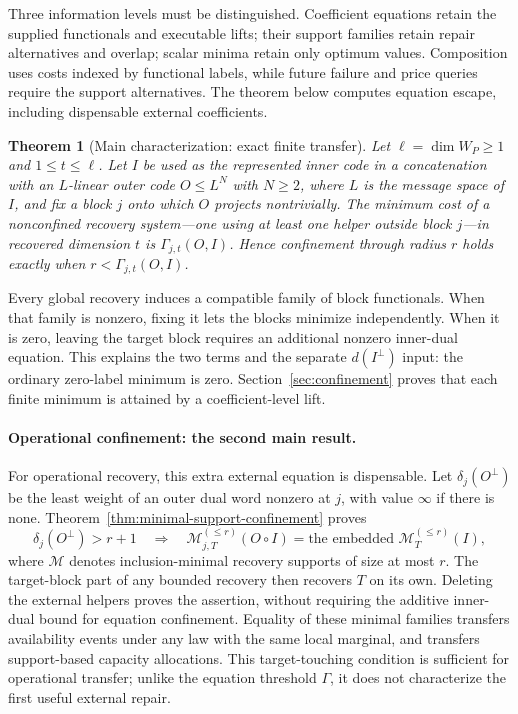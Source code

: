 \documentclass[11pt]{article}
\newtheorem{theorem}{Theorem}[section]
\theoremstyle{definition}
\begin{document}
Three information levels must be distinguished.  Coefficient equations
retain the supplied functionals and executable lifts; their support families
retain repair alternatives and overlap; scalar minima retain only optimum
values.  Composition uses costs indexed by functional labels, while future
failure and price queries require the support alternatives.  The theorem
below computes equation escape, including dispensable external coefficients.

\begin{theorem}[Main characterization: exact finite transfer]
\label{thm:main}
%
%
Let $\ell=\dim W_P\geq1$ and $1\leq t\leq\ell$.  Let $I$ be used as the
represented inner code in a concatenation with an
$L$-linear outer code $O\leq L^N$ with $N\geq2$, where $L$ is the message space of $I$,
and fix a block $j$ onto which $O$ projects nontrivially.  The minimum cost of a
nonconfined recovery system---one using at least one helper outside block
$j$---in recovered dimension $t$ is
$\Gamma_{j,t}(O,I)$.  Hence confinement through radius $r$ holds exactly when
$r<\Gamma_{j,t}(O,I)$.
\end{theorem}

Every global recovery induces a compatible family of block functionals.
When that family is nonzero, fixing it lets the blocks minimize independently.
When it is zero, leaving the target block requires an additional nonzero
inner-dual equation.  This explains the two terms and the separate
$d(I^\perp)$ input: the ordinary zero-label minimum is zero.
Section~\ref{sec:confinement} proves that each finite minimum is attained by a
coefficient-level lift.

\paragraph{Operational confinement: the second main result.}
For operational recovery, this extra external equation is dispensable.
Let $\delta_j(O^\perp)$ be the least weight of an outer dual word nonzero
at $j$, with value $\infty$ if there is none.
Theorem~\ref{thm:minimal-support-confinement} proves
\[
 \delta_j(O^\perp)>r+1
 \quad\Longrightarrow\quad
 \mathcal M_{j,T}^{(\leq r)}(O\circ I)
 =\text{the embedded }\mathcal M_T^{(\leq r)}(I),
\]
where $\mathcal M$ denotes inclusion-minimal recovery supports of size at
most $r$.  The target-block part of any bounded recovery then recovers $T$
on its own.  Deleting the external helpers proves the assertion, without
requiring the additive inner-dual bound for equation confinement.  Equality
of these minimal families transfers availability events under any law with
the same local marginal, and transfers support-based capacity allocations.  This target-touching
condition is sufficient for operational transfer; unlike the equation
threshold $\Gamma$, it does not characterize the first useful external repair.
\end{document}
